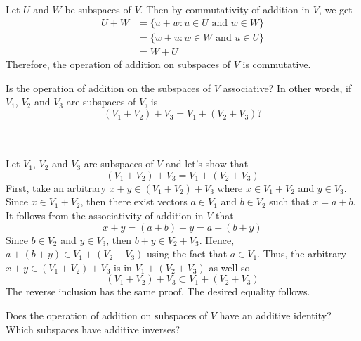 \begin{solution}
    \\ Let $U$ and $W$ be subspaces of $V$. Then by commutativity of addition in $V$, we get
    \begin{align*}
        U+W &= \{u+w : u \in U \text{ and } w \in W\} \\
        &= \{w+u : w \in W \text{ and } u \in U\} \\
        &= W + U
    \end{align*}
    Therefore, the operation of addition on subspaces of $V$ is commutative. \\
\end{solution}

\begin{exercise}
    Is the operation of addition on the subspaces of $V$ associative? In other words, if $V_1$, $V_2$ and $V_3$ are subspaces of $V$, is
    $$(V_1 + V_2) + V_3 = V_1 + (V_2 + V_3)?$$ \\
\end{exercise}

\begin{solution}
    \\ Let $V_1$, $V_2$ and $V_3$ are subspaces of $V$ and let's show that 
    $$(V_1 + V_2) + V_3 = V_1 + (V_2 + V_3)$$
    First, take an arbitrary $x + y \in (V_1 + V_2) + V_3$ where $x \in V_1 + V_2$ and $y \in V_3$. Since $x \in V_1 + V_2$, then there exist vectors $a \in V_1$ and $b \in V_2$ such that $x = a+b$. It follows from the associativity of addition in $V$ that
    $$x+y = (a+b) + y = a + (b + y)$$
    Since $b \in V_2$ and $y \in V_3$, then $b+y \in V_2 + V_3$. Hence, $a + (b+y) \in V_1 + (V_2 + V_3)$ using the fact that $a \in V_1$. Thus, the arbitrary $x+y \in (V_1 + V_2) + V_3$ is in $V_1 + (V_2 + V_3)$ as well so 
    $$(V_1 + V_2) + V_3 \subset V_1 + (V_2 + V_3)$$
    The reverse inclusion has the same proof. The desired equality follows. \\
\end{solution}

\begin{exercise}
    Does the operation of addition on subspaces of $V$ have an additive identity? Which subspaces have additive inverses? \\
\end{exercise}

